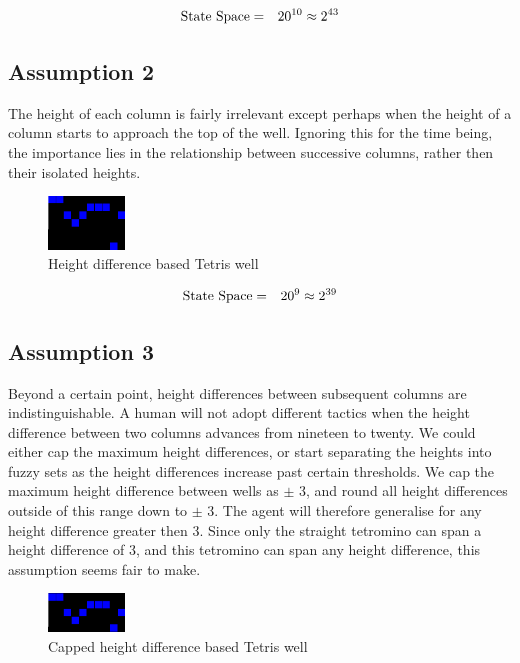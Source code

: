 \documentclass{rucsthesis}
\begin{document}
\begin{eqnarray}
\centering
\textrm{State Space} & = & 20^{10} \approx 2^{43}
\end{eqnarray}

\subsection*{Assumption 2}

The height of each column is fairly irrelevant except perhaps when the height of a column starts to approach the top of the well. Ignoring this for the time being, the importance lies in the relationship between successive columns, rather then their isolated heights.

\begin{figure}[h]
\centering
\includegraphics[width=0.8in]{diffheightwell.png}
\caption{Height difference based Tetris well}
\label{fig:diffheightwell}
\end{figure}

\begin{eqnarray}
\centering
\textrm{State Space} & = & 20^{9} \approx 2^{39}
\end{eqnarray}

\subsection*{Assumption 3}

Beyond a certain point, height differences between subsequent columns are indistinguishable. A human will not adopt different tactics when the height difference between two columns advances from nineteen to twenty. We could either cap the maximum height differences, or start separating the heights into fuzzy sets as the height differences increase past certain thresholds. We cap the maximum height difference between wells as $\pm$ 3, and round all height differences outside of this range down to $\pm$ 3. The agent will therefore generalise for any height difference greater then 3. Since only the straight tetromino can span a height difference of 3, and this tetromino can span any height difference, this assumption seems fair to make. 

\begin{figure}[h]
\centering
\includegraphics[width=0.8in]{capdiffheightwell.png}
\caption{Capped height difference based Tetris well}
\label{fig:capdiffheightwell}
\end{figure}
\end{document}

